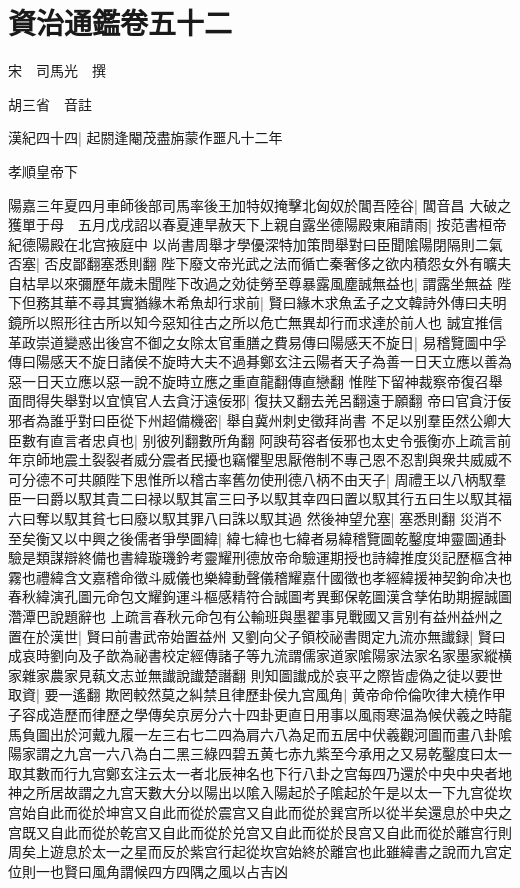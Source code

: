 \chapter{資治通鑑卷五十二}
宋　司馬光　撰

胡三省　音註

漢紀四十四|{
	起閼逢閹茂盡旃蒙作噩凡十二年}


孝順皇帝下

陽嘉三年夏四月車師後部司馬率後王加特奴掩擊北匈奴於閶吾陸谷|{
	閶音昌}
大破之獲單于母　五月戊戌詔以春夏連旱赦天下上親自露坐德陽殿東廂請雨|{
	按范書桓帝紀德陽殿在北宫掖庭中}
以尚書周舉才學優深特加策問舉對曰臣聞隂陽閉隔則二氣否塞|{
	否皮鄙翻塞悉則翻}
陛下廢文帝光武之法而循亡秦奢侈之欲内積怨女外有曠夫自枯旱以來彌歷年歲未聞陛下改過之効徒勞至尊暴露風塵誠無益也|{
	謂露坐無益}
陛下但務其華不尋其實猶緣木希魚却行求前|{
	賢曰緣木求魚孟子之文韓詩外傳曰夫明鏡所以照形往古所以知今惡知往古之所以危亡無異却行而求達於前人也}
誠宜推信革政崇道變惑出後宫不御之女除太官重膳之費易傳曰陽感天不旋日|{
	易稽覽圖中孚傳曰陽感天不旋日諸侯不旋時大夫不過朞鄭玄注云陽者天子為善一日天立應以善為惡一日天立應以惡一說不旋時立應之重直龍翻傳直戀翻}
惟陛下留神裁察帝復召舉面問得失舉對以宜慎官人去貪汙遠佞邪|{
	復扶又翻去羌呂翻遠于願翻}
帝曰官貪汙佞邪者為誰乎對曰臣從下州超備機密|{
	舉自冀州刺史徵拜尚書}
不足以别羣臣然公卿大臣數有直言者忠貞也|{
	别彼列翻數所角翻}
阿諛苟容者佞邪也太史令張衡亦上疏言前年京師地震土裂裂者威分震者民擾也竊懼聖思厭倦制不專己恩不忍割與衆共威威不可分德不可共願陛下思惟所以稽古率舊勿使刑德八柄不由天子|{
	周禮王以八柄馭羣臣一曰爵以馭其貴二曰禄以馭其富三曰予以馭其幸四曰置以馭其行五曰生以馭其福六曰奪以馭其貧七曰廢以馭其罪八曰誅以馭其過}
然後神望允塞|{
	塞悉則翻}
災消不至矣衡又以中興之後儒者爭學圖緯|{
	緯七緯也七緯者易緯稽覽圖乾鑿度坤靈圖通卦驗是類謀辯終備也書緯璇璣鈐考靈耀刑德放帝命驗運期授也詩緯推度災記歷樞含神霧也禮緯含文嘉稽命徵斗威儀也樂緯動聲儀稽耀嘉什國徵也孝經緯援神契鉤命决也春秋緯演孔圖元命包文耀鉤運斗樞感精符合誠圖考異郵保乾圖漢含孳佑助期握誠圖濳潭巴說題辭也}
上疏言春秋元命包有公輸班與墨翟事見戰國又言别有益州益州之置在於漢世|{
	賢曰前書武帝始置益州}
又劉向父子領校祕書閲定九流亦無䜟録|{
	賢曰成哀時劉向及子歆為祕書校定經傳諸子等九流謂儒家道家隂陽家法家名家墨家縱横家雜家農家見蓻文志並無䜟說䜟楚譖翻}
則知圖䜟成於哀平之際皆虚偽之徒以要世取資|{
	要一遙翻}
欺罔較然莫之糾禁且律歷卦侯九宫風角|{
	黄帝命伶倫吹律大橈作甲子容成造歷而律歷之學傳矣京房分六十四卦更直日用事以風雨寒温為候伏羲之時龍馬負圖出於河戴九履一左三右七二四為肩六八為足而五居中伏羲觀河圖而畫八卦隂陽家謂之九宫一六八為白二黑三綠四碧五黄七赤九紫至今承用之又易乾鑿度曰太一取其數而行九宫鄭玄注云太一者北辰神名也下行八卦之宫每四乃還於中央中央者地神之所居故謂之九宫天數大分以陽出以隂入陽起於子隂起於午是以太一下九宫從坎宫始自此而從於坤宫又自此而從於震宫又自此而從於巽宫所以從半矣還息於中央之宫既又自此而從於乾宫又自此而從於兑宫又自此而從於艮宫又自此而從於離宫行則周矣上遊息於太一之星而反於紫宫行起從坎宫始終於離宫也此雖緯書之說而九宫定位則一也賢曰風角謂候四方四隅之風以占吉凶}
